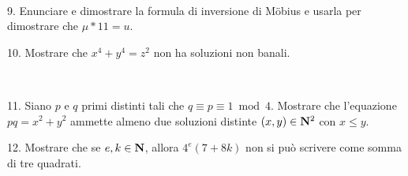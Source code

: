 \ve\ \vs\item{9.} Enunciare e dimostrare la formula di inversione di
M\"obius e usarla per dimostrare che $\mu*1\!\!1=u$.

\vv

\item{10.} Mostrare che  $x^4+y^4=z^2$ non ha soluzioni non banali.

\ve\ \vs\item{11.} Siano $p$ e $q$ primi distinti tali che $q\equiv
p\equiv1\bmod4$. Mostrare che l'equazione $pq=x^2+y^2$ ammette
almeno due soluzioni distinte $(x,y)\in{\bf N}^2$ con $x\leq y$.

\vss

\item{12.} Mostrare che se $e,k\in{\bf N}$, allora $4^e(7+8k)$ non si pu\`{o}
scrivere come somma di tre quadrati.

%
%
 \bye
